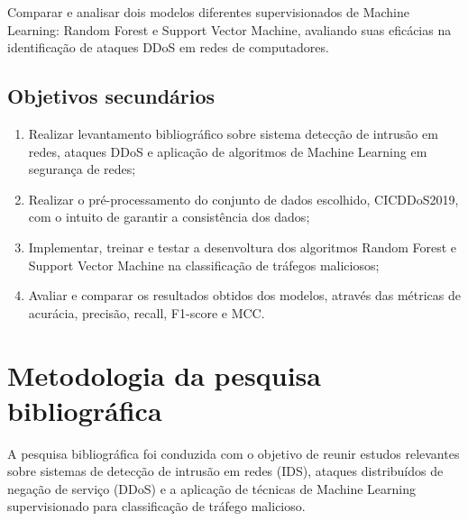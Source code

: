 \documentclass[
    12pt,                %
    openright,           %
    oneside,             %
    a4paper,             %
    english,             %
    brazil               %
]{abntex2}
\begin{document}
Comparar e analisar dois modelos diferentes supervisionados de Machine Learning: Random Forest e Support Vector Machine, avaliando suas eficácias na identificação de ataques DDoS em redes de computadores.

\subsection{Objetivos secundários}

\begin{enumerate}
    \item  Realizar levantamento bibliográfico sobre sistema detecção de intrusão em redes, ataques DDoS e aplicação de algoritmos de Machine Learning em segurança de redes;
    \item Realizar o pré-processamento do conjunto de dados escolhido, CICDDoS2019, com o intuito de garantir a consistência dos dados;
    \item Implementar, treinar e testar a desenvoltura dos algoritmos Random Forest e Support Vector Machine na classificação de tráfegos maliciosos;
    \item Avaliar e comparar os resultados obtidos dos modelos, através das métricas de acurácia, precisão, recall, F1-score e MCC.
\end{enumerate}

\section{Metodologia da pesquisa bibliográfica}
\label{sec:metodologia_pesquisa}

A pesquisa bibliográfica foi conduzida com o objetivo de reunir estudos relevantes sobre sistemas de detecção de intrusão em redes (IDS), ataques distribuídos de negação de serviço (DDoS) e a aplicação de técnicas de Machine Learning supervisionado para classificação de tráfego malicioso.
\end{document}
